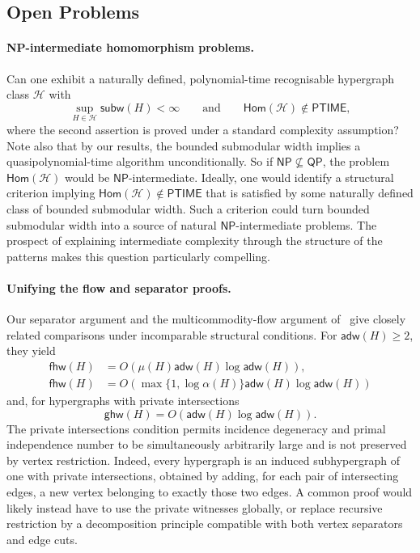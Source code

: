 \documentclass[11pt,letterpaper]{article}
\theoremstyle{definition}
\theoremstyle{remark}
\newcommand{\cH}{\mathcal H}
\newcommand{\Hom}{\mathsf{Hom}}
\newcommand{\ghw}{\mathsf{ghw}}
\newcommand{\fhw}{\mathsf{fhw}}
\newcommand{\adw}{\mathsf{adw}}
\newcommand{\subw}{\mathsf{subw}}
\newcommand{\PTIME}{\mathsf{PTIME}}
\newcommand{\NP}{\mathsf{NP}}
\newcommand{\QP}{\mathsf{QP}}
\providecommand{\adw}{\operatorname{adw}}
\providecommand{\subw}{\operatorname{subw}}
\providecommand{\fhw}{\operatorname{fhw}}
\providecommand{\PTIME}{\mathsf{PTIME}}
\begin{document}
\subsection{Open Problems}
\label{sec:stoc-open-problems}

\paragraph{NP-intermediate homomorphism problems.}
Can one exhibit a naturally defined, polynomial-time recognisable
hypergraph class $\cH$ with
\[
 \sup_{H\in\cH}\subw(H)<\infty
 \qquad\text{and}\qquad
 \Hom(\cH)\notin\PTIME,
\]
where the second assertion is proved under a standard complexity
assumption? Note also that by our results, the bounded submodular width implies a quasipolynomial-time algorithm unconditionally. So if $\NP\nsubseteq\QP$, the problem $\Hom(\cH)$ would be $\NP$-intermediate. Ideally, one would identify a structural criterion implying $\Hom(\cH)\notin\PTIME$ that is satisfied by some naturally defined class of bounded submodular width. Such a criterion could turn bounded submodular width into a source of natural $\NP$-intermediate problems. The prospect of explaining intermediate complexity through the structure of the patterns makes this question particularly compelling.


\paragraph{Unifying the flow and separator proofs.}
Our separator argument and the multicommodity-flow argument
of~\cite{Lanzinger2026Cuts} give closely related comparisons under
incomparable structural conditions. For $\adw(H)\ge2$, they yield
\[
 \begin{aligned}
 \fhw(H)&=O(\mu(H)\adw(H)\log\adw(H)),\\
 \fhw(H)&=O(\max\{1,\log\alpha(H)\}\adw(H)\log\adw(H))
 \end{aligned}
\]
and, for hypergraphs with private intersections
\[
 \ghw(H)=O(\adw(H)\log\adw(H)).
\]
The private intersections condition permits incidence degeneracy and primal independence number to be simultaneously arbitrarily large and is not
preserved by vertex restriction. Indeed, every
hypergraph is an induced subhypergraph of one with private intersections,
obtained by adding, for each pair of intersecting edges, a new vertex
belonging to exactly those two edges.
 A common proof would likely instead have to use the private witnesses globally, or replace recursive restriction by a
decomposition principle compatible with both vertex separators and edge
cuts.
\end{document}
